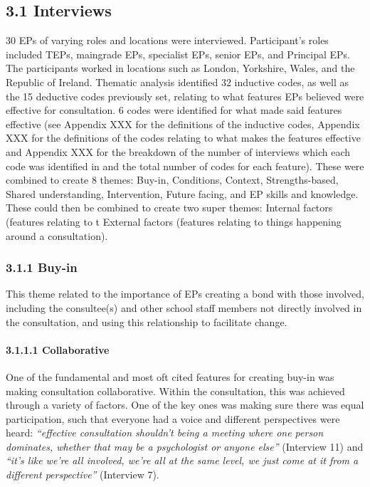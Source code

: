 \documentclass[
  english,
  man]{apa7}
\let\oldparagraph\paragraph
\renewcommand{\paragraph}[1]{\oldparagraph{#1}\mbox{}}
\begin{document}
\elandscape

\hypertarget{interviews-2}{%
\subsection{3.1 Interviews}\label{interviews-2}}

30 EPs of varying roles and locations were interviewed. Participant's roles included TEPs, maingrade EPs, specialist EPs, senior EPs, and Principal EPs. The participants worked in locations such as London, Yorkshire, Wales, and the Republic of Ireland. Thematic analysis identified 32 inductive codes, as well as the 15 deductive codes previously set, relating to what features EPs believed were effective for consultation. 6 codes were identified for what made said features effective (see Appendix XXX for the definitions of the inductive codes, Appendix XXX for the definitions of the codes relating to what makes the features effective and Appendix XXX for the breakdown of the number of interviews which each code was identified in and the total number of codes for each feature). These were combined to create 8 themes: Buy-in, Conditions, Context, Strengths-based, Shared understanding, Intervention, Future facing, and EP skills and knowledge. These could then be combined to create two super themes: Internal factors (features relating to t External factors (features relating to things happening around a consultation).

\hypertarget{buy-in}{%
\subsubsection{3.1.1 Buy-in}\label{buy-in}}

This theme related to the importance of EPs creating a bond with those involved, including the consultee(s) and other school staff members not directly involved in the consultation, and using this relationship to facilitate change.

\hypertarget{collaborative}{%
\paragraph{3.1.1.1 Collaborative}\label{collaborative}}

One of the fundamental and most oft cited features for creating buy-in was making consultation collaborative. Within the consultation, this was achieved through a variety of factors. One of the key ones was making sure there was equal participation, such that everyone had a voice and different perspectives were heard: \emph{``effective consultation shouldn't being a meeting where one person dominates, whether that may be a psychologist or anyone else''} (Interview 11) and \emph{``it's like we're all involved, we're all at the same level, we just come at it from a different perspective''} (Interview 7).
\end{document}

